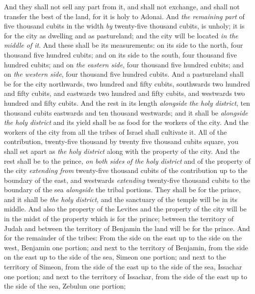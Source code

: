 \begin{biblechapter}
\verse And they shall not sell any part from it, and shall not exchange, and shall not transfer the best of the land, for it is holy to Adonai.
\verse And \textit{the remaining part} of five thousand cubits in the width \textit{by} twenty-five thousand cubits, is unholy; it is for the city as dwelling and as pastureland; and the city will be located \textit{in the middle of it}.
\verse And these shall be its measurements: on its side to the north, four thousand five hundred cubits; and on its side to the south, four thousand five hundred cubits; and on \textit{the eastern side}, four thousand five hundred cubits; and on \textit{the western side}, four thousand five hundred cubits.
\verse And a pastureland shall be for the city northwards, two hundred and fifty cubits, southwards two hundred and fifty cubits, and eastwards two hundred and fifty cubits, and westwards two hundred and fifty cubits.
\verse And the rest in its length \textit{alongside} \textit{the holy district}, ten thousand cubits eastwards and ten thousand westwards; and it shall be \textit{alongside} \textit{the holy district} and its yield shall be as food for the workers of the city.
\verse And the workers of the city from all the tribes of Israel shall cultivate it.
\verse All of the contribution, twenty-five thousand by twenty five thousand cubits square, you shall set apart as \textit{the holy district} along with the property of the city.
\verse And the rest shall be to the prince, \textit{on both sides} \textit{of the holy district} and of the property of the city \textit{extending from} twenty-five thousand cubits of the contribution up to the boundary of the east, and westwards \textit{extending} twenty-five thousand cubits to the boundary of the sea \textit{alongside} the tribal portions. They shall be for the prince, and it shall be \textit{the holy district}, and the sanctuary of the temple will be in its middle.
\verse And also the property of the Levites and the property of the city will be in the midst of the property which is for the prince; between the territory of Judah and between the territory of Benjamin the land will be for the prince.
\verse And for the remainder of the tribes: From the side on the east up to the side on the west, Benjamin one portion;
\verse and next to the territory of Benjamin, from the side on the east up to the side of the sea, Simeon one portion;
\verse and next to the territory of Simeon, from the side of the east up to the side of the sea, Issachar one portion;
\verse and next to the territory of Issachar, from the side of the east up to the side of the sea, Zebulun one portion;

\end{biblechapter}
